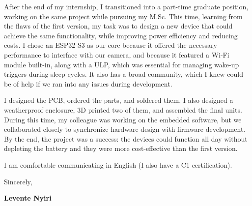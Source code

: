 \documentclass{article}
\begin{document}
After the end of my internship, I transitioned into a part-time graduate position, working on the same project while pursuing my M.Sc. This time, learning from the flaws of the first version, my task was to design a new device that could achieve the same functionality, while improving power efficiency and reducing costs. 
I chose an ESP32-S3 as our core because it offered the necessary performance to interface with our camera, and because it featured a Wi-Fi module built-in, along with a ULP, which was essential for managing wake-up triggers during sleep cycles. It also has a broad community, which I knew could be of help if we ran into any issues during development.

I designed the PCB, ordered the parts, and soldered them. I also designed a weatherproof enclosure, 3D printed two of them, and assembled the final units. During this time, my colleague was working on the embedded software, but we collaborated closely to synchronize hardware design with firmware development. By the end, the project was a success: the devices could function all day without depleting the battery and they were more cost-effective than the first version.


I am comfortable communicating in English (I also have a C1 certification).

\vspace{2em}

Sincerely,

\vspace{1em}
\textbf{Levente Nyiri}
\end{document}
